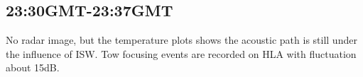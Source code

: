 \subsection{23:30GMT-23:37GMT}
No radar image, but the temperature plots shows the acoustic path is
still under the influence of ISW. Tow focusing events are recorded
on HLA with fluctuation about 15dB.


